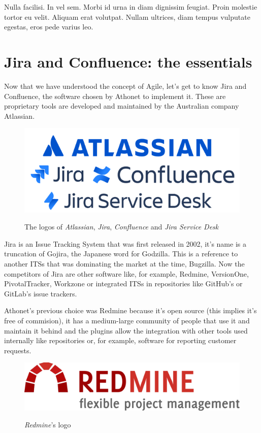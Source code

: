 \begin{savequote}[75mm]
Nulla facilisi. In vel sem. Morbi id urna in diam dignissim feugiat. Proin molestie tortor eu velit. Aliquam erat volutpat. Nullam ultrices, diam tempus vulputate egestas, eros pede varius leo.
\end{savequote}

\chapter{Jira and Confluence: the essentials}

Now that we have understood the concept of Agile, let's get to know Jira and Confluence, the software chosen by Athonet to implement it.
These are proprietary tools are developed and maintained by the Australian company Atlassian.

\begin{figure}[H]
	\centering
	\includegraphics[width=.7\textwidth]{resources/atlassian_logo}\\
	\caption{The logos of \textit{Atlassian}, \textit{Jira}, \textit{Confluence} and \textit{Jira Service Desk}}
\end{figure}

Jira is an Issue Tracking System that was first released in 2002, it's name is a truncation of Gojira, the Japanese word for Godzilla.
This is a reference to another ITSs that was dominating the market at the time, Bugzilla.
Now the competitors of Jira are other software like, for example, Redmine, VersionOne, PivotalTracker, Workzone or integrated ITSs in repositories like GitHub's or GitLab's issue trackers.

Athonet's previous choice was Redmine because it's open source (this implies it's free of commision), it has a medium-large community of people that use it and maintain it behind and the plugins allow the integration with other tools used internally like repositories or, for example, software for reporting customer requests.

\begin{figure}[H]
	\centering
	\includegraphics[width=.6\textwidth]{resources/redmine_logo}\\
	\caption{\textit{Redmine}'s logo}
\end{figure}


